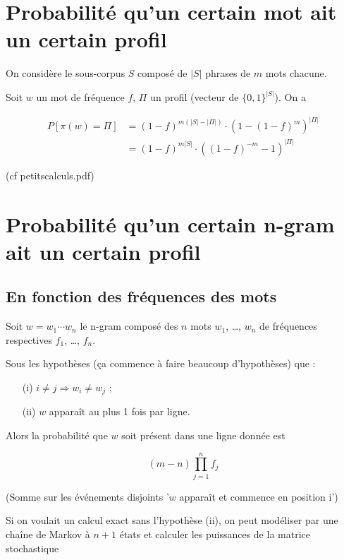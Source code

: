 \documentclass{article}
\begin{document}
\tableofcontents
\newpage

\section{Probabilité qu'un certain mot ait un certain profil}

On considère le sous-corpus $S$ composé de $|S|$ phrases de $m$ mots chacune.

Soit $w$ un mot de fréquence $f$, $\Pi$ un profil (vecteur de $\{0,1\}^{|S|}$). On a

\begin{align}
	P[\pi(w)=\Pi] & = (1-f)^{m(|S|-|\Pi|)}\cdot(1-(1-f)^m)^{|\Pi|} \\
	& = (1-f)^{m|S|}\cdot((1-f)^{-m}-1)^{|\Pi|}
\end{align}

(cf petitscalculs.pdf)



\section{Probabilité qu'un certain n-gram ait un certain profil}

\subsection{En fonction des fréquences des mots}

Soit $w=w_1 \cdots w_n$ le n-gram composé des $n$ mots $w_1$, \dots , $w_n$ de fréquences respectives $f_1$, \dots , $f_n$.

Sous les hypothèses (ça commence à faire beaucoup d'hypothèses) que :

\begin{itemize}
	\item[(i)] $i \neq j \Rightarrow w_i \neq w_j$ ;
	\item[(ii)] $w$ apparaît au plus 1 fois par ligne.
\end{itemize}

Alors la probabilité que $w$ soit présent dans une ligne donnée est

\begin{equation}
	(m-n)\prod_{j=1}^n f_j
\end{equation}

(Somme sur les événements disjoints '$w$ apparaît et commence en position i')

Si on voulait un calcul exact sans l'hypothèse (ii), on peut modéliser par une chaîne de Markov à $n+1$ états et calculer les puissances de la matrice stochastique
\end{document}
